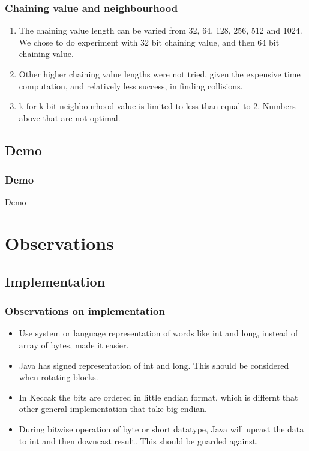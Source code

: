 \documentclass{beamer}
\begin{document}
\begin{frame}
\frametitle{Chaining value and neighbourhood}
\begin{enumerate}
\item The chaining value length can be varied from 32, 64, 128, 256, 512 and 1024. We chose to do experiment
with 32 bit chaining value, and then 64 bit chaining value.
\item Other higher chaining value lengths were not tried, given the expensive time computation, and relatively
less success, in finding collisions.
\item k for k bit neighbourhood value is limited to less than equal to 2. Numbers above that are not optimal. 
\end{enumerate}
\end{frame}

\subsection{Demo}
\begin{frame}
\frametitle{Demo}
Demo
\end{frame}

\section{Observations}

\subsection{Implementation}

\begin{frame}
\frametitle{Observations on implementation}
\begin{itemize}
\item Use system or language representation of words like int and long, instead of array of bytes, made
it easier.
\item Java has signed representation of int and long. This should be considered when rotating blocks.
\item In Keccak the bits are ordered in little endian format, which is differnt that other general
implementation that take big endian.
\item During bitwise operation of byte or short datatype, Java will upcast the data to int and then
downcast result. This should be guarded against.
\end{itemize}
\end{frame}
\end{document}

